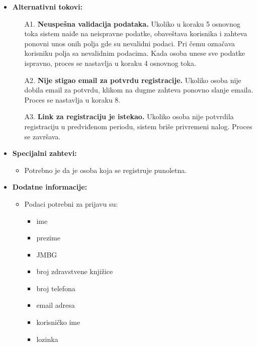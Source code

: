 \documentclass[titlepage]{article}
\begin{document}
\begin{itemize}
    
    \item \textbf{Alternativni tokovi:}
        \begin{itemize}
            \item[A1.] \textbf{Neuspešna validacija podataka.} Ukoliko u koraku 5 osnovnog toka sistem naiđe na neispravne podatke, obaveštava korisnika i zahteva ponovni unos onih polja gde su nevalidni podaci. Pri čemu označava korisniku polja sa nevalidnim podacima. Kada osoba unese sve podatke ispravno, proces se nastavlja u koraku 4 osnovnog toka.
            \item[A2.] \textbf{Nije stigao email za potvrdu registracije.} Ukoliko osoba nije dobila email za potvrdu, klikom na dugme zahteva ponovno slanje emaila. Proces se nastavlja u koraku 8.
	    \item[A3.] \textbf{Link za registraciju je istekao.} Ukoliko osoba nije potvrdila registraciju u predviđenom periodu, sistem briše privremeni nalog. Proces se završava.
        \end{itemize}
    
    \item \textbf{Specijalni zahtevi:}
		\begin{itemize}
			\item Potrebno je da je osoba koja se registruje punoletna.
		\end{itemize}
  
    \item \textbf{Dodatne informacije:}
        \begin{itemize}
            \item  Podaci potrebni za prijavu su:
                \begin{itemize}
                    \item ime
                    \item prezime
                    \item JMBG
                    \item broj zdravstvene knjižice
                    \item broj telefona
                    \item email adresa
		    \item korisničko ime
		    \item lozinka
                \end{itemize}
        \end{itemize}

\end{itemize}
\end{document}
